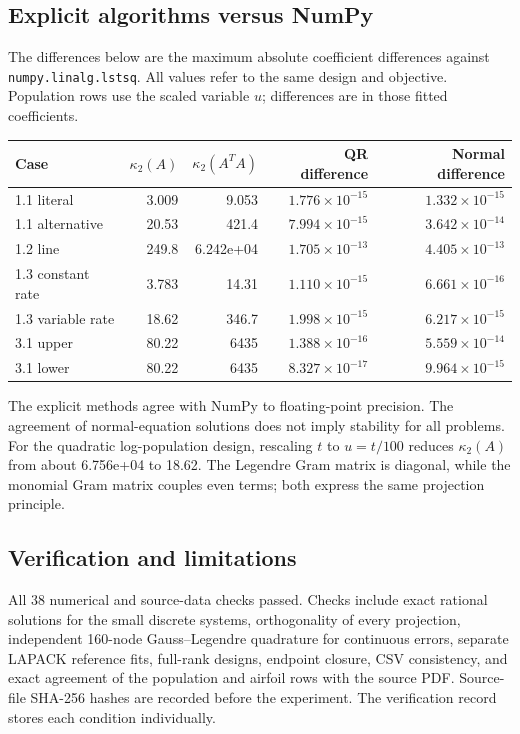 \documentclass[11pt,a4paper]{article}
\begin{document}
\subsection{Explicit algorithms versus NumPy}
The differences below are the maximum absolute coefficient differences against \texttt{numpy.linalg.lstsq}. All values refer to the same design and objective. Population rows use the scaled variable $u$; differences are in those fitted coefficients.
\begin{center}\small
\begin{tabular}{lrrrr}\toprule
Case & $\kappa_2(A)$ & $\kappa_2(A^TA)$ & QR difference & Normal difference\\\midrule
1.1 literal & 3.009 & 9.053 & $1.776\times10^{-15}$ & $1.332\times10^{-15}$ \\
1.1 alternative & 20.53 & 421.4 & $7.994\times10^{-15}$ & $3.642\times10^{-14}$ \\
1.2 line & 249.8 & 6.242e+04 & $1.705\times10^{-13}$ & $4.405\times10^{-13}$ \\
1.3 constant rate & 3.783 & 14.31 & $1.110\times10^{-15}$ & $6.661\times10^{-16}$ \\
1.3 variable rate & 18.62 & 346.7 & $1.998\times10^{-15}$ & $6.217\times10^{-15}$ \\
3.1 upper & 80.22 & 6435 & $1.388\times10^{-16}$ & $5.559\times10^{-14}$ \\
3.1 lower & 80.22 & 6435 & $8.327\times10^{-17}$ & $9.964\times10^{-15}$ \\
\bottomrule\end{tabular}
\end{center}
The explicit methods agree with NumPy to floating-point precision. The agreement of normal-equation solutions does not imply stability for all problems. For the quadratic log-population design, rescaling $t$ to $u=t/100$ reduces $\kappa_2(A)$ from about 6.756e+04 to 18.62. The Legendre Gram matrix is diagonal, while the monomial Gram matrix couples even terms; both express the same projection principle.

\subsection{Verification and limitations}
All 38 numerical and source-data checks passed. Checks include exact rational solutions for the small discrete systems, orthogonality of every projection, independent 160-node Gauss--Legendre quadrature for continuous errors, separate LAPACK reference fits, full-rank designs, endpoint closure, CSV consistency, and exact agreement of the population and airfoil rows with the source PDF. Source-file SHA-256 hashes are recorded before the experiment. The verification record stores each condition individually.
\end{document}
